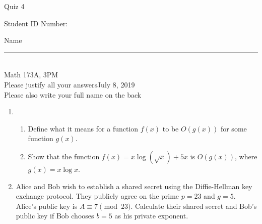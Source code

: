 \documentclass[12pt]{article}
\begin{document}
\begin{flushleft} 
\centerline{\LARGE{Quiz 4}} 
\vspace{5 mm}
{Student ID Number:}\hfill  
{Name \rule {2 in}{0.01in}}\\
Math 173A, 3PM
\\
{Please justify all your answers}\hfill {July 8, 2019}
\\
{Please also write your full name on the back} 

\medskip
\end{flushleft}

\begin{enumerate}
	\item \begin{enumerate}
		\item Define what it means for a function $f(x)$ to be $O(g(x))$ for some function $g(x)$.
		\vfill
		\item Show that the function $f(x) = x\log(\sqrt{x}) + 5x$ is $O(g(x))$, where $g(x) = x\log x$.
		\vfill
	\end{enumerate}

	\item Alice and Bob wish to establish a shared secret using the Diffie-Hellman key exchange protocol. They publicly agree on the prime $p = 23$ and $g=5$. Alice's public key is $A \equiv 7\pmod{23}$. Calculate their shared secret and Bob's public key if Bob chooses $b = 5$ as his private exponent.
	\vfill
\end{enumerate}

\end{document}

